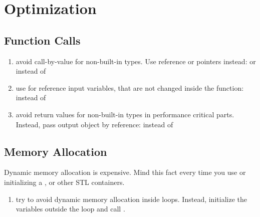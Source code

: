 \section{Optimization}
\subsection{Function Calls}
\begin{enumerate}
\item avoid call-by-value for non-built-in types.  Use reference or pointers instead:  or  instead of 
\item use  for reference input variables, that are not changed inside the function:  instead of 
\item avoid return values for non-built-in types in performance critical parts. Instead, pass output object by reference:  instead of   
\end{enumerate}
\subsection{Memory Allocation}
Dynamic memory allocation is expensive. Mind this fact every time you use  or initializing a , or other STL containers.
\begin{enumerate}
\item try to avoid dynamic memory allocation inside loops. Instead, initialize the variables outside the loop and call .
\end{enumerate}
